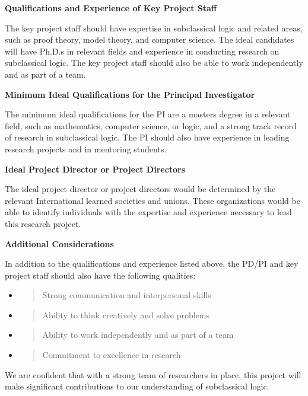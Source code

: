 \textbf{Qualifications and Experience of Key Project Staff}

The key project staff should have expertise in subclassical logic and
related areas, such as proof theory, model theory, and computer science.
The ideal candidates will have Ph.D.s in relevant fields and experience
in conducting research on subclassical logic. The key project staff
should also be able to work independently and as part of a team.

\textbf{Minimum Ideal Qualifications for the Principal Investigator}

The minimum ideal qualifications for the PI are a
master\textquotesingle s degree in a relevant field, such as
mathematics, computer science, or logic, and a strong track record of
research in subclassical logic. The PI should also have experience in
leading research projects and in mentoring students.

\textbf{Ideal Project Director or Project Directors}

The ideal project director or project directors would be determined by
the relevant International learned societies and unions. These
organizations would be able to identify individuals with the expertise
and experience necessary to lead this research project.

\textbf{Additional Considerations}

In addition to the qualifications and experience listed above, the PD/PI
and key project staff should also have the following qualities:

\begin{itemize}
\item
  \begin{quote}
  Strong communication and interpersonal skills
  \end{quote}
\item
  \begin{quote}
  Ability to think creatively and solve problems
  \end{quote}
\item
  \begin{quote}
  Ability to work independently and as part of a team
  \end{quote}
\item
  \begin{quote}
  Commitment to excellence in research
  \end{quote}
\end{itemize}

We are confident that with a strong team of researchers in place, this
project will make significant contributions to our understanding of
subclassical logic.

